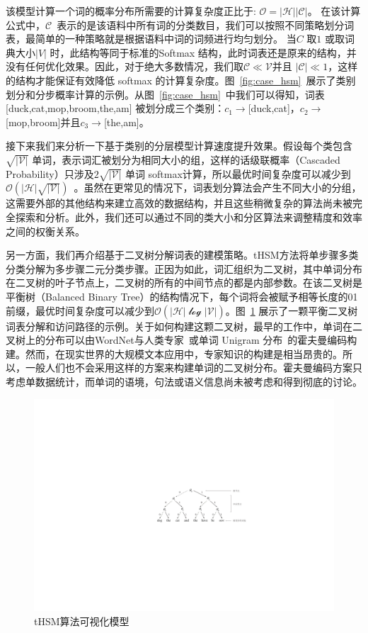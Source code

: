 该模型计算一个词的概率分布所需要的计算复杂度正比于: $\mathcal{O =|H||C|}$。 在该计算公式中，$\mathcal{C}$~表示的是该语料中所有词的分类数目，我们可以按照不同策略划分词表，最简单的一种策略就是根据语料中词的词频进行均匀划分。 当$C$ 取$1$ 或取词典大小$|V|$ 时，此结构等同于标准的Softmax 结构，此时词表还是原来的结构，并没有任何优化效果。因此，对于绝大多数情况，我们取$\mathcal{C} \ll \mathcal{V}$并且 $|\mathcal{C}|\ll 1$，这样的结构才能保证有效降低 softmax 的计算复杂度。图~\ref{fig:case_hsm}~展示了类别划分和分步概率计算的示例。从图~\ref{fig:case_hsm}~中我们可以得知，词表 [duck,cat,mop,broom,the,am] 被划分成三个类别：$c_1\to$[duck,cat]，$c_2\to$[mop,broom]并且$c_3\to$[the,am]。


接下来我们来分析一下基于类别的分层模型计算速度提升效果。假设每个类包含 $\sqrt{\mathcal{|V|}}$ 单词，表示词汇被划分为相同大小的组，这样的话级联概率（Cascaded Probability）只涉及$2\sqrt{\mathcal{|V|}}$ 单词 softmax计算，所以最优时间复杂度可以减少到$\mathcal{O}(\mathcal{|H|}\sqrt{\mathcal{|V|}})$~。虽然在更常见的情况下，词表划分算法会产生不同大小的分组，这需要外部的其他结构来建立高效的数据结构，并且这些稍微复杂的算法尚未被完全探索和分析。此外，我们还可以通过不同的类大小和分区算法来调整精度和效率之间的权衡关系。

另一方面，我们再介绍基于二叉树分解词表的建模策略。tHSM方法将单步骤多类分类分解为多步骤二元分类步骤。正因为如此，词汇组织为二叉树，其中单词分布在二叉树的叶子节点上，二叉树的所有的中间节点的都是内部参数。在该二叉树是平衡树（Balanced Binary Tree）的结构情况下，每个词将会被赋予相等长度的01前缀，最优时间复杂度可以减少到$\mathcal{O(|H|\log \mathcal{|V|})}$。图~\ref{fig:case_thsm} 展示了一颗平衡二叉树词表分解和访问路径的示例。关于如何构建这颗二叉树，最早的工作中，单词在二叉树上的分布可以由WordNet与人类专家~或单词 Unigram 分布~的霍夫曼编码构建。然而，在现实世界的大规模文本应用中，专家知识的构建是相当昂贵的。所以，一般人们也不会采用这样的方案来构建单词的二叉树分布。霍夫曼编码方案只考虑单数据统计，而单词的语境，句法或语义信息尚未被考虑和得到彻底的讨论。

\begin{figure}[!t]
  \centering
\includegraphics[width=.85\linewidth]{./figures/thsm-example.pdf}
\caption{tHSM算法可视化模型}\label{fig:case_thsm}
\end{figure}

